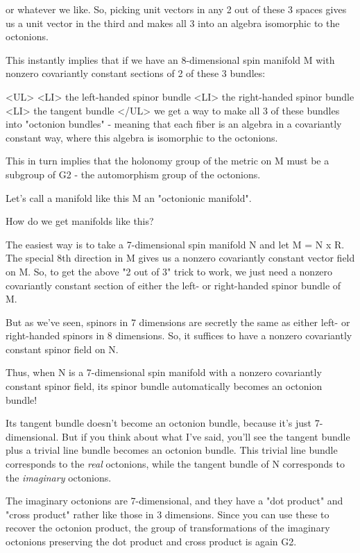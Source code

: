 or whatever we like.   So, picking unit vectors in any 2 out of these
3 spaces gives us a unit vector in the third and makes all 3 into an
algebra isomorphic to the octonions.

This instantly implies that if we have an 8-dimensional spin manifold M 
with nonzero covariantly constant sections of 2 of these 3 bundles:
 
<UL>
<LI>
the left-handed spinor bundle
<LI>
the right-handed spinor bundle
<LI>
the tangent bundle
</UL>
we get a way to make all 3 of these bundles into "octonion bundles" -
meaning that each fiber is an algebra in a covariantly constant way, 
where this algebra is isomorphic to the octonions.

This in turn implies that the holonomy group of the metric on M must 
be a subgroup of G2 - the automorphism group of the octonions.  

Let's call a manifold like this M an "octonionic manifold".

How do we get manifolds like this?
 
The easiest way is to take a 7-dimensional spin manifold N and let 
M = N x R.  The special 8th direction in M gives us a nonzero 
covariantly constant vector field on M.  So, to get the above 
"2 out of 3" trick to work, we just need a nonzero covariantly 
constant section of either the left- or right-handed spinor bundle 
of M.

But as we've seen, spinors in 7 dimensions are secretly the same
as either left- or right-handed spinors in 8 dimensions.  So, it
suffices to have a nonzero covariantly constant spinor field on N.

Thus, when N is a 7-dimensional spin manifold with a nonzero covariantly 
constant spinor field, its spinor bundle automatically becomes an octonion 
bundle!  


Its tangent bundle doesn't become an octonion bundle, because it's
just 7-dimensional.  But if you think about what I've said, you'll see
the tangent bundle plus a trivial line bundle becomes an octonion
bundle.  This trivial line bundle corresponds to the \emph{real}
octonions, while the tangent bundle of N corresponds to the
\emph{imaginary} octonions.


The imaginary octonions are 7-dimensional, and they have a "dot
product" and "cross product" rather like those in 3
dimensions.  Since you can use these to recover the octonion product,
the group of transformations of the imaginary octonions preserving the
dot product and cross product is again G2.
 

